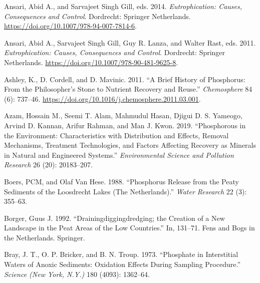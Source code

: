 \documentclass[a4paper,11pt]{article}
\newenvironment{CSLReferences}%
  {}%
  {\par}
\begin{document}
\noindent

\setlength{\parindent}{-0.5cm}
\setlength{\leftskip}{0.5cm}
\setlength{\parskip}{8pt}

\hypertarget{refs}{}
\begin{CSLReferences}{1}{0}
\leavevmode\hypertarget{ref-ansariEutrophicationCausesConsequences2014}{}%
Ansari, Abid A., and Sarvajeet Singh Gill, eds. 2014. \emph{Eutrophication: {Causes}, {Consequences} and {Control}}. {Dordrecht}: {Springer Netherlands}. \url{https://doi.org/10.1007/978-94-007-7814-6}.

\leavevmode\hypertarget{ref-ansariEutrophicationCausesConsequences2011}{}%
Ansari, Abid A., Sarvajeet Singh Gill, Guy R. Lanza, and Walter Rast, eds. 2011. \emph{Eutrophication: Causes, Consequences and Control}. {Dordrecht}: {Springer Netherlands}. \url{https://doi.org/10.1007/978-90-481-9625-8}.

\leavevmode\hypertarget{ref-ashleyBriefHistoryPhosphorus2011}{}%
Ashley, K., D. Cordell, and D. Mavinic. 2011. {``A Brief History of Phosphorus: {From} the Philosopher's Stone to Nutrient Recovery and Reuse.''} \emph{Chemosphere} 84 (6): 737--46. \url{https://doi.org/10.1016/j.chemosphere.2011.03.001}.

\leavevmode\hypertarget{ref-azamPhosphorousEnvironmentCharacteristics2019}{}%
Azam, Hossain M., Seemi T. Alam, Mahmudul Hasan, Djigui D. S. Yameogo, Arvind D. Kannan, Arifur Rahman, and Man J. Kwon. 2019. {``Phosphorous in the Environment: Characteristics with Distribution and Effects, Removal Mechanisms, Treatment Technologies, and Factors Affecting Recovery as Minerals in Natural and Engineered Systems.''} \emph{Environmental Science and Pollution Research} 26 (20): 20183--207.

\leavevmode\hypertarget{ref-boersPhosphorusReleasePeaty1988}{}%
Boers, PCM, and Olaf Van Hese. 1988. {``Phosphorus Release from the Peaty Sediments of the {Loosdrecht Lakes} ({The Netherlands}).''} \emph{Water Research} 22 (3): 355--63.

\leavevmode\hypertarget{ref-borgerDrainingDiggingDredging1992}{}%
Borger, Guus J. 1992. {``Draining{}digging{}dredging; the Creation of a New Landscape in the Peat Areas of the Low Countries.''} In, 131--71. Fens and Bogs in the {Netherlands}. {Springer}.

\leavevmode\hypertarget{ref-brayPhosphateInterstitialWaters1973}{}%
Bray, J. T., O. P. Bricker, and B. N. Troup. 1973. {``Phosphate in {Interstitial Waters} of {Anoxic Sediments}: {Oxidation Effects} During {Sampling Procedure}.''} \emph{Science (New York, N.Y.)} 180 (4093): 1362--64.


\end{CSLReferences}
\end{document}
